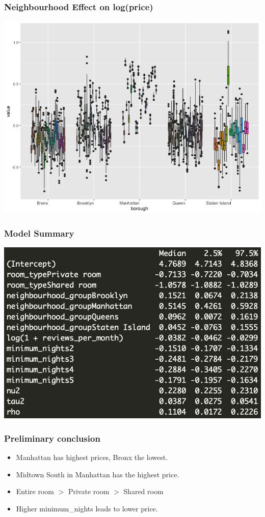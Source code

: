 \documentclass{beamer}
\begin{document}
\begin{frame}
\frametitle{Neighbourhood Effect on log(price)}
\includegraphics[scale=0.4]{CARBayes2.jpeg}

\end{frame}


\begin{frame}
\frametitle{Model Summary}
\includegraphics[scale=0.75]{summary.png}
\end{frame}





\begin{frame}
	\frametitle{Preliminary conclusion}
	\begin{itemize}
		\item Manhattan has highest prices, Bronx the lowest.
		\item Midtown South in Manhattan has the highest price.
		\item Entire room $>$ Private room $>$ Shared room
		\item Higher minimum\_nights leads to lower price. 
	\end{itemize}
\end{frame}
\end{document}
